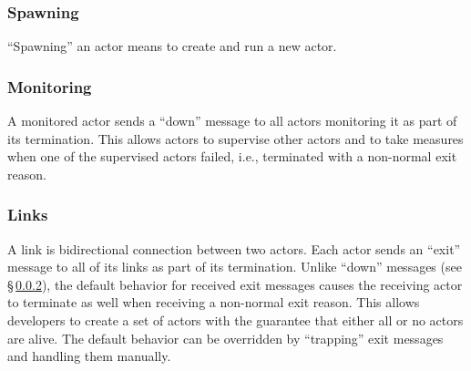 \subsubsection{Spawning}

``Spawning'' an actor means to create and run a new actor.

\subsubsection{Monitoring}
\label{sec:monitoring}

A monitored actor sends a ``down'' message to all actors monitoring it as part of its termination.
This allows actors to supervise other actors and to take measures when one of the supervised actors failed, i.e., terminated with a non-normal exit reason.

\subsubsection{Links}

A link is bidirectional connection between two actors.
Each actor sends an ``exit'' message to all of its links as part of its termination.
Unlike ``down'' messages (see \S\,\ref{sec:monitoring}), the default behavior for received exit messages causes the receiving actor to terminate as well when receiving a non-normal exit reason.
This allows developers to create a set of actors with the guarantee that either all or no actors are alive.
The default behavior can be overridden by ``trapping'' exit messages and handling them manually.
